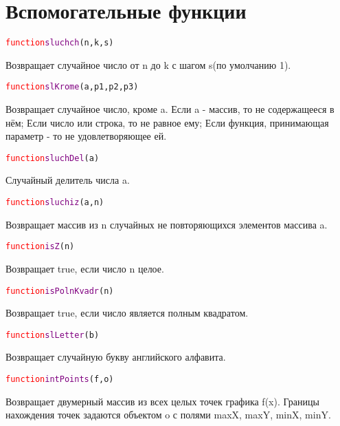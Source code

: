 \documentclass[a4paper,12pt]{article}
\begin{document}
	\section{Вспомогательные функции}
	\begin{alltt} 	
		\textcolor{Red}{function} \textcolor{Purple}{sluchch}(n,k,s)
	\end{alltt}
	Возвращает случайное число от n до k с шагом s(по умолчанию 1).
	\begin{alltt} 	
		\textcolor{Red}{function} \textcolor{Purple}{slKrome}(a,p1,p2,p3)
	\end{alltt}
	Возвращает случайное число, кроме a. Если a \-- массив, то не содержащееся в нём; Если число или строка, то не равное ему; Если функция, принимающая параметр - то не удовлетворяющее ей.
	\begin{alltt} 	
		\textcolor{Red}{function} \textcolor{Purple}{sluchDel}(a)
	\end{alltt}
	Случайный делитель числа a.
	\begin{alltt} 	
		\textcolor{Red}{function} \textcolor{Purple}{sluchiz}(a,n)
	\end{alltt}
	Возвращает массив из n случайных не повторяющихся элементов массива a. 
	\begin{alltt} 	
		\textcolor{Red}{function} \textcolor{Purple}{isZ}(n)
	\end{alltt}
	Возвращает true, если число n целое.
	\begin{alltt} 	
		\textcolor{Red}{function} \textcolor{Purple}{isPolnKvadr}(n)
	\end{alltt}
	Возвращает true, если число является полным квадратом.
	\begin{alltt} 	
		\textcolor{Red}{function} \textcolor{Purple}{slLetter}(b)
	\end{alltt}
	Возвращает случайную букву английского алфавита.
	\begin{alltt} 	
		\textcolor{Red}{function} \textcolor{Purple}{intPoints}(f,o)
	\end{alltt}
  	Возвращает двумерный массив из всех целых точек графика f(x).  Границы нахождения точек задаются объектом o с полями maxX, maxY, minX, minY.
\end{document}
